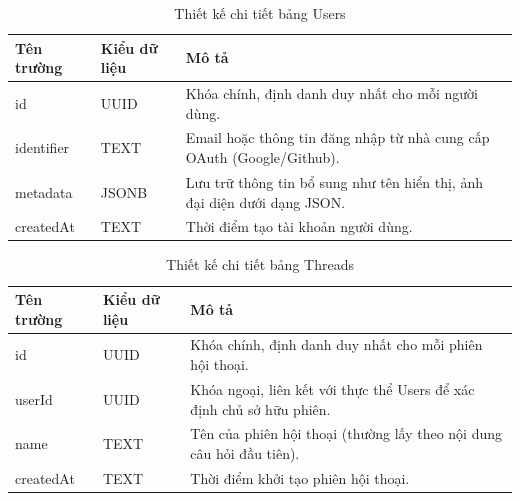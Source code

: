 \documentclass[../DoAn.tex]{subfiles}
\begin{document}
\begin{table}[H]
\centering
\begin{tabular}{|l|l|p{8cm}|}
\hline
\textbf{Tên trường} & \textbf{Kiểu dữ liệu} & \textbf{Mô tả} \\ \hline
id & UUID & Khóa chính, định danh duy nhất cho mỗi người dùng. \\ \hline
identifier & TEXT & Email hoặc thông tin đăng nhập từ nhà cung cấp OAuth (Google/Github). \\ \hline
metadata & JSONB & Lưu trữ thông tin bổ sung như tên hiển thị, ảnh đại diện dưới dạng JSON. \\ \hline
createdAt & TEXT & Thời điểm tạo tài khoản người dùng. \\ \hline
\end{tabular}
\caption{Thiết kế chi tiết bảng Users}
\label{table:db_users}
\end{table}

\begin{table}[H]
\centering
\begin{tabular}{|l|l|p{8cm}|}
\hline
\textbf{Tên trường} & \textbf{Kiểu dữ liệu} & \textbf{Mô tả} \\ \hline
id & UUID & Khóa chính, định danh duy nhất cho mỗi phiên hội thoại. \\ \hline
userId & UUID & Khóa ngoại, liên kết với thực thể Users để xác định chủ sở hữu phiên. \\ \hline
name & TEXT & Tên của phiên hội thoại (thường lấy theo nội dung câu hỏi đầu tiên). \\ \hline
createdAt & TEXT & Thời điểm khởi tạo phiên hội thoại. \\ \hline
\end{tabular}
\caption{Thiết kế chi tiết bảng Threads}
\label{table:db_threads}
\end{table}
\end{document}
